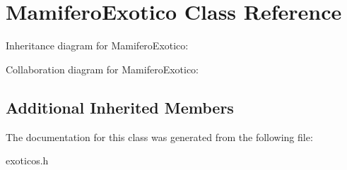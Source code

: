 \hypertarget{classMamiferoExotico}{}\section{Mamifero\+Exotico Class Reference}
\label{classMamiferoExotico}


Inheritance diagram for Mamifero\+Exotico\+:


Collaboration diagram for Mamifero\+Exotico\+:
\subsection*{Additional Inherited Members}


The documentation for this class was generated from the following file\+:\begin{DoxyCompactItemize}
\item 
exoticos.\+h\end{DoxyCompactItemize}
